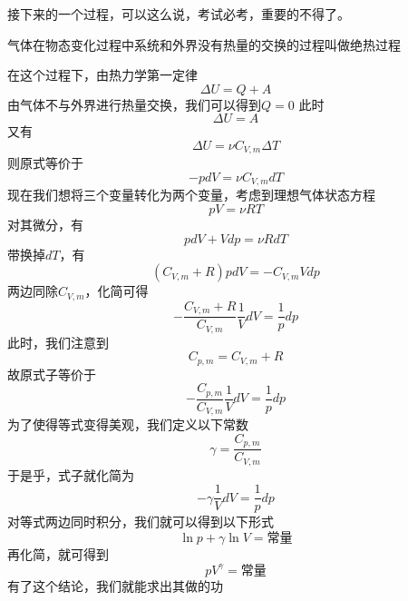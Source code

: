 \documentclass[lang=cn,10pt]{elegantbook}
\begin{document}
	接下来的一个过程，可以这么说，考试必考，重要的不得了。
	
	\begin{definition}[绝热过程]
		气体在物态变化过程中系统和外界没有热量的交换的过程叫做绝热过程
	\end{definition}
		在这个过程下，由热力学第一定律
	\begin{equation*}
		\varDelta U=Q+A 
	\end{equation*}
	由气体不与外界进行热量交换，我们可以得到$Q=0$
	此时
	\begin{equation*}
		\varDelta U=A 
	\end{equation*}
	又有
	\begin{equation*}
		\varDelta U=\nu C_{V,m}\varDelta T
	\end{equation*}
	则原式等价于
	\begin{equation*}
		-pdV=\nu C_{V,m}d T
	\end{equation*}
	现在我们想将三个变量转化为两个变量，考虑到理想气体状态方程
	\begin{equation*}
		pV=\nu RT
	\end{equation*}
	对其微分，有
	\begin{equation*}
		pdV+Vdp=\nu R dT
	\end{equation*}
	带换掉$dT$，有
	\begin{equation*}
		( C_{V,m}+R)pdV=- C_{V,m}Vdp
	\end{equation*}
	两边同除$ C_{V,m}$，化简可得
	\begin{equation*}
		-\frac{C_{V,m}+R}{ C_{V,m}}\frac{1}{V}dV=\frac{1}{p}dp
	\end{equation*}
	此时，我们注意到
		\begin{equation*}
		C_{p,m}=C_{V,m}+ R
	\end{equation*}
	故原式子等价于
	\begin{equation*}
			-\frac{	C_{p,m}}{ C_{V,m}}\frac{1}{V}dV=\frac{1}{p}dp
	\end{equation*}
	为了使得等式变得美观，我们定义以下常数
	\begin{equation*}
		\gamma=\frac{	C_{p,m}}{ C_{V,m}}
	\end{equation*}
	于是乎，式子就化简为
	\begin{equation*}
		-\gamma\frac{1}{V}dV=\frac{1}{p}dp
	\end{equation*}
	对等式两边同时积分，我们就可以得到以下形式
	\begin{equation*}
		\ln p+\gamma\ln V=\text{常量}
	\end{equation*}
	再化简，就可得到
	\begin{equation*}
		pV^{\gamma}=\text{常量}
	\end{equation*}
	有了这个结论，我们就能求出其做的功
	
\end{document}
